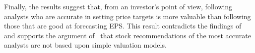\documentclass[a4paper,twoside,12pt,openright,notitlepage]{report}\usepackage[]{graphicx}\usepackage[]{color}
\begin{document}


Finally, the results suggest that, from an investor's point of view, following analysts who are accurate in setting price targets is more valuable than following those that are good at forecasting EPS.  This result contradicts the findings of~\cite{bradshaw2004} and supports the argument of~\cite{simon2011} that stock recommendations of the most accurate analysts are not based upon simple valuation models.





\processdelayedfloats
\cleardoublepage
\end{document}
